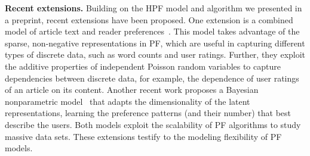 {\bf Recent extensions.}
Building on the HPF model and algorithm we presented in a preprint,
recent extensions have been proposed. One extension is a combined model of article text and
reader preferences~\cite{gopalan2014content}. This model takes
advantage of the sparse, non-negative representations in PF, which are
useful in capturing different types of discrete data, such as word
counts and user ratings. Further, they exploit the additive properties
of independent Poisson random variables to capture dependencies
between discrete data, for example, the dependence of user ratings of
an article on its content. Another recent work proposes a Bayesian
nonparametric model~\cite{gopalan2014bayesian} that adapts the
dimensionality of the latent representations, learning the preference
patterns (and their number) that best describe the users. Both models
exploit the scalability of PF algorithms to study massive data sets.
These extensions testify to the modeling flexibility of PF models.
